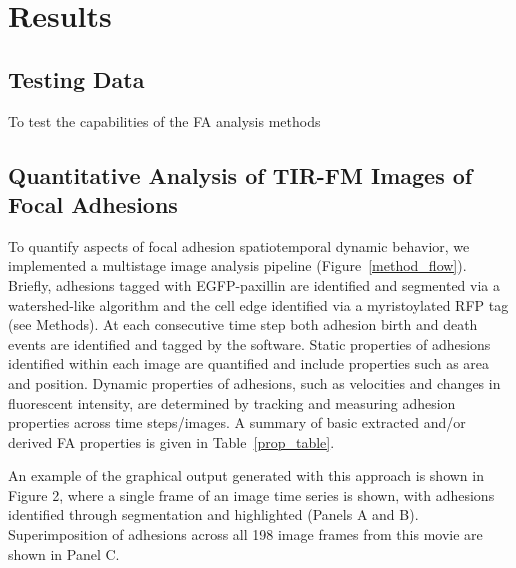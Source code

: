 \documentclass[10pt]{article}
\begin{document}
\section*{Results}

\subsection*{Testing Data}

To test the capabilities of the FA analysis methods 

\subsection*{Quantitative Analysis of TIR-FM Images of Focal Adhesions}

To quantify aspects of focal adhesion spatiotemporal dynamic behavior, we
implemented a multistage image analysis pipeline (Figure~\ref{method_flow}).
Briefly, adhesions tagged with EGFP-paxillin are identified and segmented via a
watershed-like algorithm and the cell edge identified via a myristoylated  RFP
tag (see Methods).  At each consecutive time step both adhesion birth and death
events are identified and tagged by the software. Static properties of adhesions
identified within each image are quantified and include properties such as area
and position. Dynamic properties of adhesions, such as velocities and changes in
fluorescent intensity, are determined by tracking and measuring adhesion
properties across time steps/images. A summary of basic extracted and/or derived
FA properties is given in Table~\ref{prop_table}.

An example of the graphical output generated with this approach is shown in
Figure 2, where a single frame of an image time series is shown, with adhesions
identified through segmentation and highlighted (Panels A and B).
Superimposition of adhesions across all 198 image frames from this movie are
shown in Panel C.     
\end{document}
